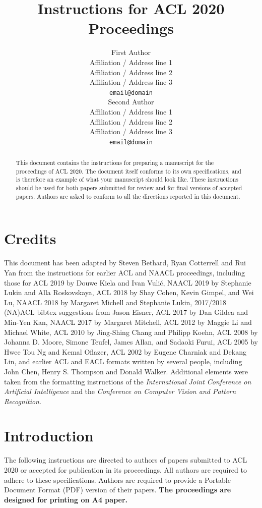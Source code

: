 \documentclass[11pt,a4paper]{article}
\title{Instructions for ACL 2020 Proceedings}
\author{First Author \\
  Affiliation / Address line 1 \\
  Affiliation / Address line 2 \\
  Affiliation / Address line 3 \\
  \texttt{email@domain} \\\And
  Second Author \\
  Affiliation / Address line 1 \\
  Affiliation / Address line 2 \\
  Affiliation / Address line 3 \\
  \texttt{email@domain} \\}
\date{}
\begin{document}
\maketitle
\begin{abstract}
  This document contains the instructions for preparing a manuscript for the proceedings of ACL 2020.
  The document itself conforms to its own specifications, and is therefore an example of what your manuscript should look like.
  These instructions should be used for both papers submitted for review and for final versions of accepted papers.
  Authors are asked to conform to all the directions reported in this document.
\end{abstract}

\section{Credits}

This document has been adapted
by Steven Bethard, Ryan Cotterrell and Rui Yan
from the instructions for earlier ACL and NAACL proceedings, including those for
ACL 2019 by Douwe Kiela and Ivan Vuli\'{c},
NAACL 2019 by Stephanie Lukin and Alla Roskovskaya,
ACL 2018 by Shay Cohen, Kevin Gimpel, and Wei Lu,
NAACL 2018 by Margaret Michell and Stephanie Lukin,
2017/2018 (NA)ACL bibtex suggestions from Jason Eisner,
ACL 2017 by Dan Gildea and Min-Yen Kan,
NAACL 2017 by Margaret Mitchell,
ACL 2012 by Maggie Li and Michael White,
ACL 2010 by Jing-Shing Chang and Philipp Koehn,
ACL 2008 by Johanna D. Moore, Simone Teufel, James Allan, and Sadaoki Furui,
ACL 2005 by Hwee Tou Ng and Kemal Oflazer,
ACL 2002 by Eugene Charniak and Dekang Lin,
and earlier ACL and EACL formats written by several people, including
John Chen, Henry S. Thompson and Donald Walker.
Additional elements were taken from the formatting instructions of the \emph{International Joint Conference on Artificial Intelligence} and the \emph{Conference on Computer Vision and Pattern Recognition}.

\section{Introduction}

The following instructions are directed to authors of papers submitted to ACL 2020 or accepted for publication in its proceedings.
All authors are required to adhere to these specifications.
Authors are required to provide a Portable Document Format (PDF) version of their papers.
\textbf{The proceedings are designed for printing on A4 paper.}
\end{document}
